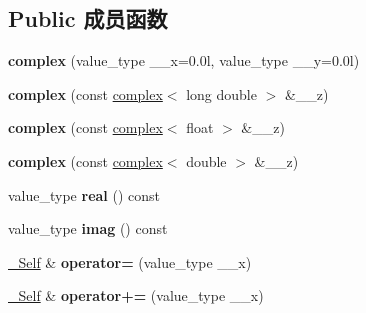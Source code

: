 \subsection*{Public 成员函数}
\begin{DoxyCompactItemize}
\item 
\mbox{\label{structcomplex_3_01long_01double_01_4_a9a2efc58445509a38886ca988cf18eaa}} 
{\bfseries complex} (value\+\_\+type \+\_\+\+\_\+x=0.\+0l, value\+\_\+type \+\_\+\+\_\+y=0.\+0l)
\item 
\mbox{\label{structcomplex_3_01long_01double_01_4_a04fc2526c67114b197bb5ca5cd36308c}} 
{\bfseries complex} (const \hyperlink{structcomplex}{complex}$<$ long double $>$ \&\+\_\+\+\_\+z)
\item 
\mbox{\label{structcomplex_3_01long_01double_01_4_aa8c6584a98ce35e36fa9b35809cde7d3}} 
{\bfseries complex} (const \hyperlink{structcomplex}{complex}$<$ float $>$ \&\+\_\+\+\_\+z)
\item 
\mbox{\label{structcomplex_3_01long_01double_01_4_ad1a5ceeb602100a16f2ef850735b4ddf}} 
{\bfseries complex} (const \hyperlink{structcomplex}{complex}$<$ double $>$ \&\+\_\+\+\_\+z)
\item 
\mbox{\label{structcomplex_3_01long_01double_01_4_a00a13f43ac39a49dd38ac4b64bf2952d}} 
value\+\_\+type {\bfseries real} () const
\item 
\mbox{\label{structcomplex_3_01long_01double_01_4_a8bcb4f7fc94ab102115b15e1e69d6176}} 
value\+\_\+type {\bfseries imag} () const
\item 
\mbox{\label{structcomplex_3_01long_01double_01_4_abf9bce4443e56c033434324caebf6b66}} 
\hyperlink{structcomplex_3_01long_01double_01_4}{\+\_\+\+Self} \& {\bfseries operator=} (value\+\_\+type \+\_\+\+\_\+x)
\item 
\mbox{\label{structcomplex_3_01long_01double_01_4_a302a01184017e0041d3fa2144251cdde}} 
\hyperlink{structcomplex_3_01long_01double_01_4}{\+\_\+\+Self} \& {\bfseries operator+=} (value\+\_\+type \+\_\+\+\_\+x)

\end{DoxyCompactItemize}
